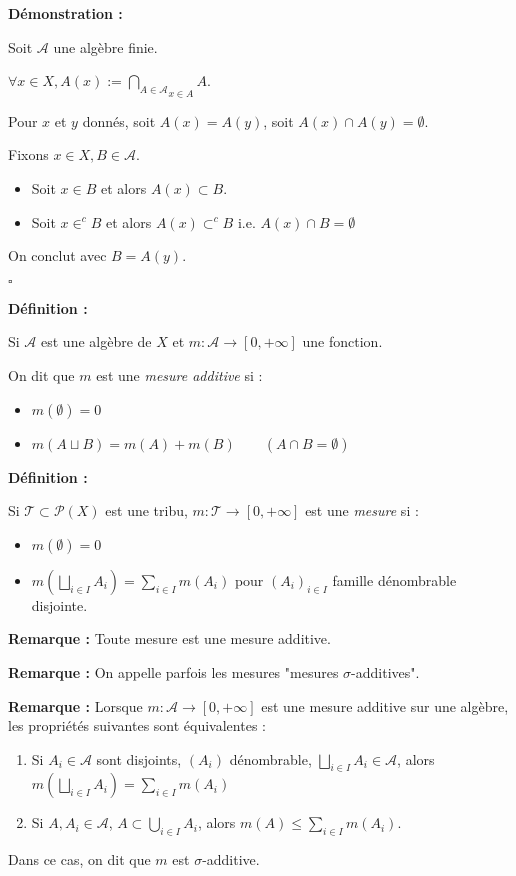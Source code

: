 \documentclass[10pt,a4paper,notitlepage ]{article}
\newenvironment{definition}{
	
	\textbf{Définition : }
}
{}
\newenvironment{demo}{

	\textbf{Démonstration :}
}{\begin{flushright}
	$\square$
\end{flushright}
}
\newenvironment{rem}{
	
	\textbf{Remarque :}}{}
\begin{document}
\begin{demo}
	Soit $\mathcal A$ une algèbre finie.
	
	$\forall x \in X, A(x) := \underset{x\in A}{\underset{A\in \mathcal A}{\bigcap}} A$.
	
	Pour $x$ et $y$ donnés, soit $A(x) = A(y)$, soit $A(x) \cap A(y) = \emptyset$.
	
	Fixons $x\in X, B\in\mathcal A$.
	\begin{itemize}
		\item Soit $x\in B$ et alors $A(x)\subset B$.
		\item Soit $x\in ^c\!\!B$ et alors $A(x)\subset ^c\!\!B$ i.e. $A(x)\cap B = \emptyset$
	\end{itemize}
	On conclut avec $B=A(y)$.
\end{demo}

\begin{definition}
	Si $\mathcal A$ est une algèbre de $X$ et $m:\mathcal A \rightarrow [0,+\infty]$ une fonction.
	
	On dit que $m$ est une \emph{mesure additive} si :
	\begin{itemize}
		\item $m(\emptyset) = 0$
		\item $m(A\sqcup B) = m(A) + m(B) \qquad (A\cap B = \emptyset)$
	\end{itemize}
\end{definition}

\begin{definition}
	Si $\mathcal T \subset \mathcal P(X)$ est une tribu, $m:\mathcal T \rightarrow [0,+\infty]$ est une \emph{mesure} si :
	\begin{itemize}
		\item $m(\emptyset) = 0$
		\item $m(\underset{i\in I}{\bigsqcup}A_i) = \sum_{i\in I}m(A_i)$ pour $(A_i)_{i\in I}$ famille dénombrable disjointe.
	\end{itemize}
\end{definition}
\begin{rem}
	Toute mesure est une mesure additive.
\end{rem}

\begin{rem}
On appelle parfois les mesures "mesures $\sigma$-additives".
\end{rem}

\begin{rem}
	Lorsque $m:\mathcal A \rightarrow [0,+\infty]$ est une mesure additive sur une algèbre, les propriétés suivantes sont équivalentes :
	\begin{enumerate}
		\item Si $A_i\in\mathcal A$ sont disjoints, $(A_i)$ dénombrable, $\underset{i\in I}{\bigsqcup}A_i \in \mathcal A$, alors $m(\underset{i\in I}{\bigsqcup}A_i) = \sum_{i\in I}m(A_i)$
		\item Si $A,A_i\in\mathcal A$, $A\subset \underset{i\in I}{\bigcup}A_i$, alors $m(A) \le \sum_{i\in I}m(A_i)$.
	\end{enumerate}
Dans ce cas, on dit que $m$ est $\sigma$-additive.
\end{rem}
\end{document}
